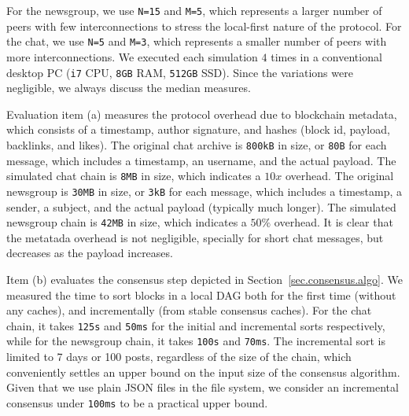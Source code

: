 \documentclass[12pt]{article}
\newcommand{\FC}       {Freechains\xspace}
\newcommand{\code}[1]  {\texttt{\footnotesize{#1}}}
\begin{document}
For the newsgroup, we use \texttt{N=15} and \texttt{M=5}, which represents a
larger number of peers with few interconnections to stress the local-first
nature of the protocol.
For the chat, we use \texttt{N=5} and \texttt{M=3}, which represents a smaller
number of peers with more interconnections.
%
We executed each simulation $4$ times in a conventional desktop PC (\texttt{i7}
CPU, \texttt{8GB} RAM, \texttt{512GB} SSD).
Since the variations were negligible, we always discuss the median measures.

Evaluation item (a) measures the protocol overhead due to blockchain metadata,
which consists of a timestamp, author signature, and hashes (block id, payload,
backlinks, and likes).
%
The original chat archive is \texttt{800kB} in size, or \texttt{80B} for each
message, which includes a timestamp, an username, and the actual payload.
The simulated chat chain is \texttt{8MB} in size, which indicates a $10x$
overhead.
The original newsgroup is \texttt{30MB} in size, or \texttt{3kB} for each
message, which includes a timestamp, a sender, a subject, and the actual
payload (typically much longer).
The simulated newsgroup chain is \texttt{42MB} in size, which indicates a
$50\%$ overhead.
%
It is clear that the metatada overhead is not negligible, specially for short
chat messages, but decreases as the payload increases.

Item (b) evaluates the consensus step depicted in
Section~\ref{sec.consensus.algo}.
We measured the time to sort blocks in a local DAG both for the first time
(without any caches), and incrementally (from stable consensus caches).
%
For the chat chain, it takes \texttt{125s} and \texttt{50ms} for the initial
and incremental sorts respectively, while for the newsgroup chain, it takes
\texttt{100s} and \texttt{70ms}.
%
%
The incremental sort is limited to 7 days or 100 posts, regardless of the size
of the chain, which conveniently settles an upper bound on the input size of
the consensus algorithm.
%
Given that we use plain JSON files in the file system, we consider an
incremental consensus under \texttt{100ms} to be a practical upper bound.
\end{document}
